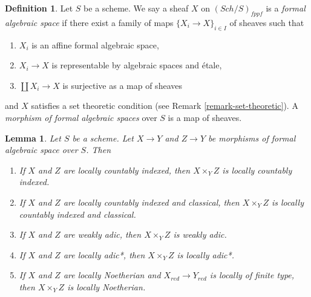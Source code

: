 \documentclass{stacks-project}
\theoremstyle{plain}
\newtheorem{lemma}[subsection]{Lemma}
\theoremstyle{definition}
\newtheorem{definition}[subsection]{Definition}
\theoremstyle{remark}
\numberwithin{equation}{subsection}
\def\Sch{\mathit{Sch}}
\begin{document}
\begin{definition}
\label{definition-formal-algebraic-space}
Let $S$ be a scheme. We say a sheaf $X$ on $(\Sch/S)_{fppf}$ is a
{\it formal algebraic space} if there exist a family of maps
$\{X_i \to X\}_{i \in I}$ of sheaves such that
\begin{enumerate}
\item $X_i$ is an affine formal algebraic space,
\item $X_i \to X$ is representable by algebraic spaces and \'etale,
\item $\coprod X_i \to X$ is surjective as a map of sheaves
\end{enumerate}
and $X$ satisfies a set theoretic condition
(see Remark \ref{remark-set-theoretic}). A
{\it morphism of formal algebraic spaces}
over $S$ is a map of sheaves.
\end{definition}

\begin{lemma}
\label{lemma-types-fibre-products}
Let $S$ be a scheme. Let $X \to Y$ and $Z \to Y$ be
morphisms of formal algebraic space over $S$. Then
\begin{enumerate}
\item If $X$ and $Z$ are locally countably indexed, then $X \times_Y Z$
is locally countably indexed.
\item If $X$ and $Z$ are locally countably indexed and classical,
then $X \times_Y Z$ is locally countably indexed and classical.
\item If $X$ and $Z$ are weakly adic, then $X \times_Y Z$
is weakly adic.
\item If $X$ and $Z$ are locally adic*, then $X \times_Y Z$ is
locally adic*.
\item If $X$ and $Z$ are locally Noetherian and $X_{red} \to Y_{red}$
is locally of finite type, then $X \times_Y Z$ is locally Noetherian.
\end{enumerate}
\end{lemma}
\end{document}
